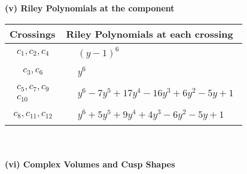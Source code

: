 \documentclass[1p]{elsarticle_modified}
\theoremstyle{definition}
\begin{document}
\newpage\renewcommand{\arraystretch}{1}
\flushleft \textbf{(v) Riley Polynomials at the component}\newline \\
\begin{tabular}{m{50pt}|m{274pt}}
Crossings & \hspace{64pt}Riley Polynomials at each crossing \\
\hline $$\begin{aligned}c_{1},c_{2},c_{4}\end{aligned}$$&$\begin{aligned}
&(y-1)^6
\end{aligned}$\\
\hline $$\begin{aligned}c_{3},c_{6}\end{aligned}$$&$\begin{aligned}
&y^6
\end{aligned}$\\
\hline $$\begin{aligned}c_{5},c_{7},c_{9}\\c_{10}\end{aligned}$$&$\begin{aligned}
&y^6-7 y^5+17 y^4-16 y^3+6 y^2-5 y+1
\end{aligned}$\\
\hline $$\begin{aligned}c_{8},c_{11},c_{12}\end{aligned}$$&$\begin{aligned}
&y^6+5 y^5+9 y^4+4 y^3-6 y^2-5 y+1
\end{aligned}$\\
\hline
\end{tabular}\\~\\
\newpage\flushleft \textbf{(vi) Complex Volumes and Cusp Shapes}
\end{document}
